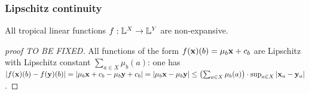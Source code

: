 \newpage



\subsubsection{Lipschitz continuity}







\begin{proposition}\label{prop:troplinear}
All tropical linear functions $f: \mathbb{L}^{X}\to \mathbb{L}^{Y}$ are non-expansive.  
\end{proposition}
\begin{proof}[proof TO BE FIXED]
All functions of the form $f(\mathbf{x})(b)= \mu_{b} \mathbf{x} + c_{b}$ are Lipschitz with Lipschitz constant
$\sum_{a\in X}\mu_{b}(a)$: 
one has $| f(\mathbf{x})(b)- f(\mathbf{y})(b) |= |\mu_{b}\mathbf{x}+c_{b} -\mu_{b}\mathbf{y}+c_{b}|=
|\mu_{b}\mathbf{x} -\mu_{b} \mathbf{y}  |\leq \left(\sum_{a\in X}\mu_{b}(a)\right)\cdot \sup_{a\in X}|\mathbf{x}_{a}-\mathbf{y}_{a}|$.

\end{proof}






